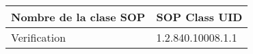 \begin{tabular}{|l|l|}
\hline
\textbf{Nombre de la clase SOP}	& \textbf{SOP Class UID} \\ \hline
Verification 			& 1.2.840.10008.1.1	 \\ \hline
\end{tabular}
